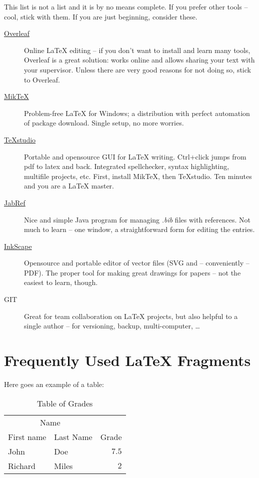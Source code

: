 \documentclass{ExcelAtFIT}
\begin{document}
This list is not a list and it is by no means complete.  If you prefer other tools -- cool, stick with them.  If you are just beginning, consider these.

\begin{description}
	\item[\href{http://www.overleaf.com/}{Overleaf}] Online \LaTeX{} editing -- if you don't want to install and learn many tools, Overleaf is a great solution: works online and allows sharing your text with your supervisor. Unless there are very good reasons for not doing so, stick to Overleaf.
	\item[\href{http://miktex.org/download}{MikTeX}] Problem-free \LaTeX{} for Windows; a distribution with perfect automation of package download. Single setup, no more worries.
	\item[\href{http://texstudio.sourceforge.net/}{TeXstudio}] Portable and opensource GUI for \LaTeX{} writing.  Ctrl+click jumps from pdf to latex and back.  Integrated spellchecker, syntax highlighting, multifile projects, etc.  First, install MikTeX, then TeXstudio.  Ten minutes and you are a \LaTeX{} master.
	\item[\href{http://jabref.sourceforge.net/download.php}{JabRef}] Nice and simple Java program for managing \textit{.bib} files with references.  Not much to learn -- one window, a straightforward form for editing the entries.
	\item[\href{https://inkscape.org/en/download/}{InkScape}] Opensource and portable editor of vector files (SVG and -- conveniently -- PDF).  The proper tool for making great drawings for papers -- not the easiest to learn, though.
	\item[GIT] Great for team collaboration on \LaTeX{} projects, but also helpful to a single author -- for versioning, backup, multi-computer, \ldots
\end{description}


\section{Frequently Used \LaTeX{} Fragments}
\label{sec:Fragments}

Here goes an example of a table:
\begin{table}[h]
	\vskip6pt
	\caption{Table of Grades}
	\centering
	\begin{tabular}{llr}
		\toprule
		\multicolumn{2}{c}{Name} \\
		\cmidrule(r){1-2}
		First name & Last Name & Grade \\
		\midrule
		John & Doe & $7.5$ \\
		Richard & Miles & $2$ \\
		\bottomrule
	\end{tabular}
	\label{tab:ExampleTable}
\end{table}
\end{document}
